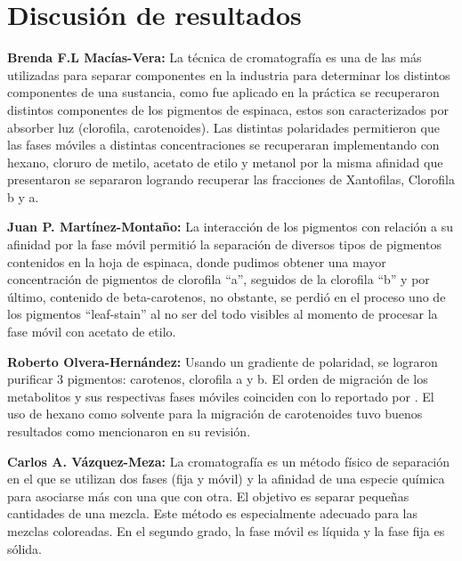 \documentclass{ITESO-Reporte}
\begin{document}
\section{Discusión de resultados}

{\color{darkgray}\bfseries Brenda F.L Macías-Vera:}\hspace{1em}
La técnica de cromatografía es una de las más utilizadas para separar componentes en la industria para determinar los distintos componentes de una sustancia, como fue aplicado en la práctica se recuperaron distintos componentes de los pigmentos de espinaca, estos son caracterizados por absorber luz (clorofila, carotenoides). Las distintas polaridades permitieron que las fases móviles a distintas concentraciones se recuperaran implementando con hexano, cloruro de metilo, acetato de etilo y metanol por la misma afinidad que presentaron se separaron logrando recuperar las fracciones de Xantofilas, Clorofila b y a.

{\color{darkgray}\bfseries Juan P. Martínez-Montaño:}\hspace{1em}
La interacción de los pigmentos con relación a su afinidad por la fase móvil permitió la separación de diversos tipos de pigmentos contenidos en la hoja de espinaca, donde pudimos obtener una mayor concentración de pigmentos de clorofila “a”, seguidos de la clorofila “b” y por último, contenido de beta-carotenos, no obstante, se perdió en el proceso uno de los pigmentos “leaf-stain” al no ser del todo visibles al momento de procesar la fase móvil con acetato de etilo.

{\color{darkgray}\bfseries Roberto Olvera-Hernández:}\hspace{1em}
Usando un gradiente de polaridad, se lograron purificar 3 pigmentos: carotenos, clorofila a y b. El orden de migración de los metabolitos y sus respectivas fases móviles coinciden con lo reportado por \textcite{Khalyfa1992}. El uso de hexano como solvente para la migración de carotenoides tuvo buenos resultados como mencionaron \textcite{Mussagy2018} en su revisión.

{\color{darkgray}\bfseries Carlos A. Vázquez-Meza:}\hspace{1em}
La cromatografía es un método físico de separación en el que se utilizan dos fases (fija y móvil) y la afinidad de una especie química para asociarse más con una que con otra. El objetivo es separar pequeñas cantidades de una mezcla. Este método es especialmente adecuado para las mezclas coloreadas. En el segundo grado, la fase móvil es líquida y la fase fija es sólida.
\end{document}
